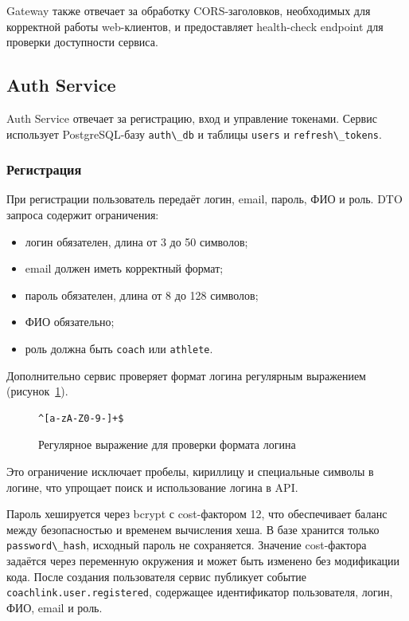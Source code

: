 Gateway также отвечает за обработку CORS-заголовков, необходимых для корректной работы web-клиентов, и предоставляет health-check endpoint для проверки доступности сервиса.

\subsection{Auth Service}

Auth Service отвечает за регистрацию, вход и управление токенами. Сервис использует PostgreSQL-базу \passthrough{\lstinline!auth\_db!} и таблицы \passthrough{\lstinline!users!} и \passthrough{\lstinline!refresh\_tokens!}.

\subsubsection{Регистрация}

При регистрации пользователь передаёт логин, email, пароль, ФИО и роль. DTO запроса содержит ограничения:

\begin{itemize}
\tightlist
\item
  логин обязателен, длина от 3 до 50 символов;
\item
  email должен иметь корректный формат;
\item
  пароль обязателен, длина от 8 до 128 символов;
\item
  ФИО обязательно;
\item
  роль должна быть \passthrough{\lstinline!coach!} или \passthrough{\lstinline!athlete!}.
\end{itemize}

Дополнительно сервис проверяет формат логина регулярным выражением (рисунок~\ref{src:login-regex}).

\begin{figure}
\begin{lstlisting}
^[a-zA-Z0-9-]+$
\end{lstlisting}
\caption{Регулярное выражение для проверки формата логина}
\label{src:login-regex}
\end{figure}

Это ограничение исключает пробелы, кириллицу и специальные символы в логине, что упрощает поиск и использование логина в API.

Пароль хешируется через bcrypt с cost-фактором 12, что обеспечивает баланс между безопасностью и временем вычисления хеша. В базе хранится только \passthrough{\lstinline!password\_hash!}, исходный пароль не сохраняется. Значение cost-фактора задаётся через переменную окружения и может быть изменено без модификации кода. После создания пользователя сервис публикует событие \passthrough{\lstinline!coachlink.user.registered!}, содержащее идентификатор пользователя, логин, ФИО, email и роль.

